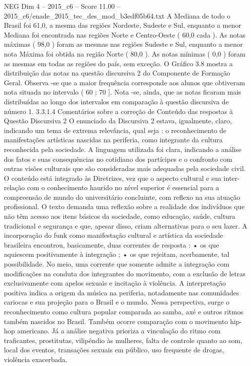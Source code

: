 \begin{textsample}{NEG Dim 4 – 2015\_c6 – Score 11.00 – 2015\_c6/enade\_2015\_tec\_des\_mod\_b3edf05b64.txt}
A Mediana de todo o Brasil foi 61,0, a mesma das regiões Nordeste, Sudeste e Sul, enquanto a menor Mediana foi encontrada nas regiões Norte e Centro-Oeste ( 60,0 cada ).
As notas máximas ( 98,0 ) foram as mesmas nas regiões Sudeste e Sul, enquanto a menor nota Máxima foi obtida na região Norte ( 80,0 ).
As notas mínimas ( 0,0 ) foram as mesmas em todas as regiões do país, sem exceção.
O Gráfico 3.8 mostra a distribuição das notas na questão discursiva 2 do Componente de Formação Geral.
Observa -se que a maior frequência corresponde aos alunos que obtiveram nota situada no intervalo ( 60 ; 70 ].
Nota -se, ainda, que as notas ficaram mais distribuídas ao longo dos intervalos em comparação à questão discursiva de número 1. 3.3.1.4 Comentários sobre a correção de Conteúdo das respostas à Questão Discursiva 2 O enunciado da Discursiva 2 estava, igualmente, claro, indicando um tema de extrema relevância, qual seja : o reconhecimento de manifestações artísticas nascidas na periferia, como integrante da cultura reconhecida pela sociedade.
A linguagem utilizada foi clara, indicando a análise dos fatos e suas consequências no cotidiano dos partícipes e o confronto com outras visões culturais que são consideradas mais adequadas pela sociedade civil.
O conteúdo está integrado às Diretrizes, vez que o aspecto cultural e sua inter-relação com o conhecimento haurido no nível superior é essencial para a compreensão de mundo do universitário concluinte, com reflexo na sua atuação profissional.
O texto demanda uma reflexão sobre a realidade dos indivíduos que não têm acesso aos itens básicos da sociedade, como educação, saúde, cultura tradicional e segurança e que, apesar disso, criam alternativas para o seu lazer.
A incorporação do funk como manifestação cultural e artística da sociedade brasileira encontrou, basicamente, duas correntes de resposta : • os que aquiescem positivamente à integração ; • os que rejeitam, acerbamente, tal possibilidade.
No meio, uma corrente que somente admite a integração com modificações na conduta dos integrantes do movimento, com a exclusão de letras exclusivamente com apelos sexuais e incitação à violência.
A interpretação positiva indica a origem da música na periferia, notadamente nas comunidades cariocas e sua projeção para o Brasil e o mundo.
Nessa perspectiva, surge o reconhecimento como cultura popular comparada ao samba, axé e outros ritmos também nascidos no Brasil.
Também ocorre comparação com o movimento hip-hop americano.
Já a análise negativa prioriza a vinculação do ritmo com traficantes, prostitutas, vilipêndio às mulheres, falta de controle quanto ao som, local dos eventos, transações sexuais em público, uso frequente de drogas, violência exacerbada.

\end{textsample}
